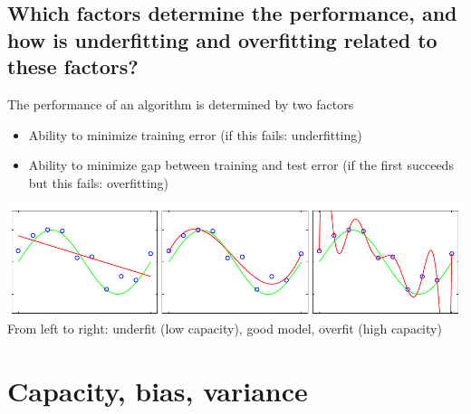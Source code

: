 \subsection{Which factors determine the performance, and how is underfitting and overfitting related to these factors?}
The performance of an algorithm is determined by two factors
\begin{itemize}
\item Ability to minimize training error (if this fails: underfitting)
\item Ability to minimize gap between training and test error (if the first succeeds but this fails: overfitting)
\end{itemize}
\includegraphics[width=\textwidth]{./img/overfit.PNG}
From left to right: underfit (low capacity), good model, overfit (high capacity)
%
\section{Capacity, bias, variance}
